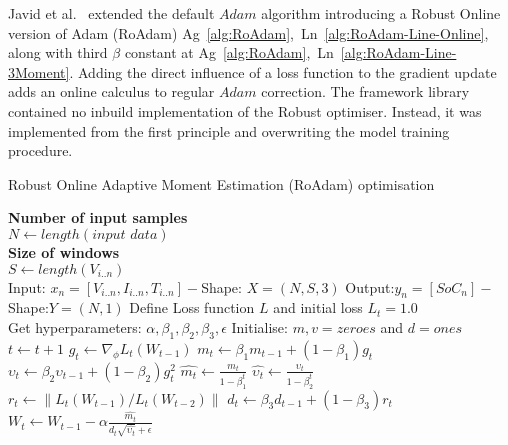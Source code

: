 %
Javid et al.~\cite{javid_adaptive_2020} extended the default $Adam$ algorithm introducing a Robust Online version of Adam (RoAdam) \mbox{Ag~\ref{alg:RoAdam}, Ln~\ref{alg:RoAdam-Line-Online}}, along with third $\beta$ constant at \mbox{Ag~\ref{alg:RoAdam}, Ln~\ref{alg:RoAdam-Line-3Moment}}.
Adding the direct influence of a loss function to the gradient update adds an online calculus to regular $Adam$ correction.
The framework library contained no inbuild implementation of the Robust optimiser.
Instead, it was implemented from the first principle and overwriting the model training procedure.
\begin{algorithm}
  \caption{Robust Online Adaptive Moment Estimation (RoAdam) optimisation}
  \begin{algorithmic}[1]
    \STATE \textbf{Number of input samples} \\ $N\gets length(\textit{input data})$\\
    \STATE \textbf{Size of windows} \\ $S\gets length(V_{i..n})$\\
    \STATE Input: $x_n = [V_{i..n}, I_{i..n}, T_{i..n}] - $Shape: $X = (N, S, 3)$
    \STATE Output:$y_n = [SoC_{n}] - $Shape:$Y = (N, 1)$
    \STATE Define Loss function $L$ and initial loss $L_t = 1.0$ \label{alg:RoAdam-Line-Loss}\\
           Get hyperparameters: $\alpha, \beta_1, \beta_2, \beta_3, \epsilon$
    \STATE Initialise: $m,v=zeroes$ and $d=ones$ \label{alg:RoAdam-Line-Vars} \\
    \STATE $t \gets t+1$
    \STATE $g_t \gets \nabla_\phi L_t (W_{t-1})$ 
    \STATE $m_t \gets \beta_1 m_{t-1}+(1-\beta_1) g_t $ 
    \STATE $\upsilon_t \gets \beta_2 \upsilon_{t-1}+ \left(1-\beta_2 \right)g^2_t $ 
    \STATE $\hat{m_t} \gets \frac{m_t}{1-\beta^t_1}$ 
    \STATE $\hat{\upsilon_t} \gets \frac{\upsilon_t}{1-\beta^t_2} $ 
    \STATE $r_t \gets \parallel L_t\left(W_{t-1}\right)/L_t\left(W_{t-2}\right) \parallel $  
    \STATE $d_t \gets \beta_3 d_{t-1}+\left(1-\beta_3\right)r_t $ 
    \STATE $W_t \gets W_{t-1}- \alpha \frac{\hat{m_t}}{d_t\sqrt{\hat{\upsilon_t}}+\epsilon} $ 
    \ENDWHILE
  \end{algorithmic}
  \label{alg:RoAdam}
\end{algorithm}
